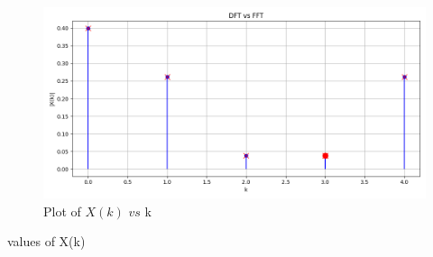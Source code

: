 \documentclass[journal,12pt,twocolumn]{IEEEtran}
\theoremstyle{remark}
\begin{document}
\begin{figure}[ht]
    \centering
    \includegraphics[width=\columnwidth]{figs/Figure_3.png}
    \caption{Plot of $X(k)$ $vs$ k}
    \label{fig:GATE.2023.EE.50.3}
\end{figure}
\begin{table}[h!]
    \centering
    
    \caption{values of X(k)}
    \label{tab:GATE.2023.EE.50.4}
\end{table}\\
\end{document}

